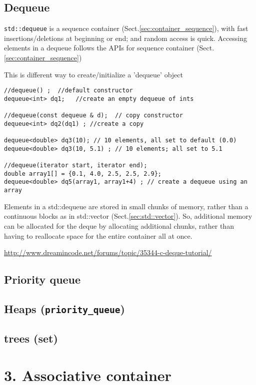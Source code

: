 \subsection{Dequeue}
\label{sec:stl:dequeue}
\label{sec:std::dequeue}

\verb!std::dequeue! is a sequence container (Sect.\ref{sec:container_sequence}),
with fast insertions/deletions at beginning or end; and random access is quick.
Accessing elements in a dequeue follows the APIs for sequence container
(Sect.\ref{sec:container_sequence})

This is different way to create/initialize a 'dequeue' object
\begin{verbatim}
//dequeue() ;  //default constructor
dequeue<int> dq1;   //create an empty dequeue of ints

//dequeue(const dequeue & d);  // copy constructor
dequeue<int> dq2(dq1) ; //create a copy 

dequeue<double> dq3(10); // 10 elements, all set to default (0.0)
dequeue<double> dq3(10, 5.1) ; // 10 elements; all set to 5.1

//dequeue(iterator start, iterator end);
double array1[] = {0.1, 4.0, 2.5, 2.5, 2.9};
dequeue<double> dq5(array1, array1+4) ; // create a dequeue using an array
\end{verbatim}

Elements in a std::dequeue are stored in small chunks of memory, rather than a
continuous blocks as in std::vector (Sect.\ref{sec:std::vector}). So, additional
memory can be allocated for the deque by allocating additional chunks, rather
than having to reallocate space for the entire container all at once.

\url{http://www.dreamincode.net/forums/topic/35344-c-deque-tutorial/}

\subsection{Priority queue}
\label{sec:priority-queue}

\cprotect\subsection{Heaps (\verb!priority_queue!)}

\subsection{trees (set)}
  
\section{3. Associative container}
\label{sec:container_associative}

